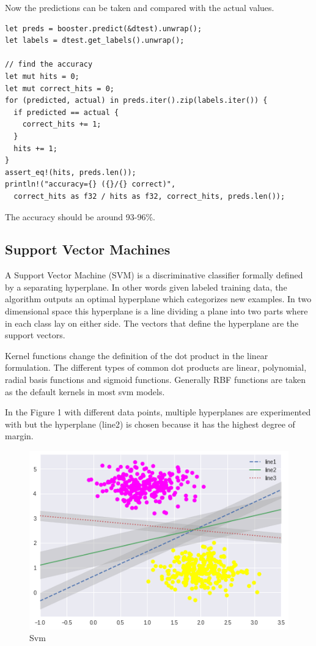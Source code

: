 \documentclass{book}
\begin{document}
Now the predictions can be taken and compared with the actual values.

\begin{lstlisting}[caption={chapter3\\/iris\_classification\_xgboost\\/src\\/main\\.rs}]
let preds = booster.predict(&dtest).unwrap();
let labels = dtest.get_labels().unwrap();

// find the accuracy
let mut hits = 0;
let mut correct_hits = 0;
for (predicted, actual) in preds.iter().zip(labels.iter()) {
  if predicted == actual {
    correct_hits += 1;
  }
  hits += 1;
}
assert_eq!(hits, preds.len());
println!("accuracy={} ({}/{} correct)",
  correct_hits as f32 / hits as f32, correct_hits, preds.len());
\end{lstlisting}

The accuracy should be around 93-96\%.

\label{par:rust_xgboost}

\label{sub:xgboost}

\subsection{Support Vector Machines}%
A Support Vector Machine (SVM) is a discriminative classifier formally defined by a separating hyperplane. In other words given labeled training data, the algorithm outputs an optimal hyperplane which categorizes new examples. In two dimensional space this hyperplane is a line dividing a plane into two parts where in each class lay on either side. The vectors that define the hyperplane are the support vectors.

Kernel functions change the definition of the dot product in the linear formulation. The different types of common dot products are linear, polynomial, radial basis functions and sigmoid functions. Generally RBF functions are taken as the default kernels in most svm models\cite{svm}.

In the Figure 1 with different data points, multiple hyperplanes are experimented with but the hyperplane (line2) is chosen because it has the highest degree of margin.

\begin{figure}
	\centering
	\includegraphics[width=0.8\linewidth]{svm.png}
	\caption{Svm}
	\label{fig:svm}
\end{figure}
\end{document}
